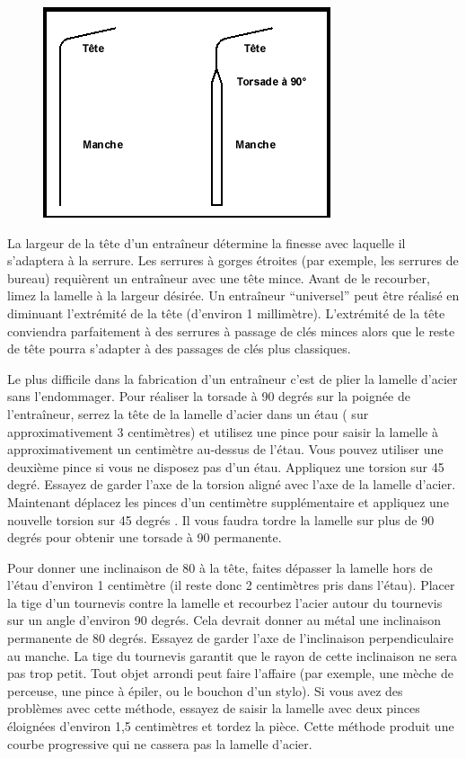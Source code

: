 \documentclass[a4paper,french,11pt,twoside]{report}
\begin{document}
\begin{figure}[h] \begin{center}
    \includegraphics[scale=0.8]{images/Image28}
    \caption{}
\end{center} \end{figure}
La largeur de la tête d'un entraîneur détermine la finesse avec laquelle il s'adaptera à la serrure. Les serrures à gorges étroites (par exemple, les serrures de bureau) requièrent un entraîneur avec une tête mince. Avant de le recourber, limez la lamelle à la largeur désirée. Un entraîneur \enquote{universel} peut être réalisé en diminuant l'extrémité de la tête (d'environ 1 millimètre). L'extrémité de la tête conviendra parfaitement à des serrures à passage de clés minces alors que le reste de tête pourra s'adapter à des passages de clés plus classiques.

Le plus difficile dans la fabrication d'un entraîneur c'est de plier la lamelle d'acier sans l'endommager. Pour réaliser la torsade à 90 degrés sur la poignée de l'entraîneur, serrez la tête de la lamelle d'acier dans un étau ( sur approximativement 3 centimètres) et utilisez une pince pour saisir la lamelle à approximativement un centimètre au-dessus de l'étau. Vous pouvez utiliser une deuxième pince si vous ne disposez pas d'un étau. Appliquez une torsion sur 45 degré. Essayez de garder l'axe de la torsion aligné avec l'axe de la lamelle d'acier. Maintenant déplacez les pinces d'un centimètre supplémentaire et appliquez une nouvelle torsion sur 45 degrés . Il vous faudra tordre la lamelle sur plus de 90 degrés pour obtenir une torsade à 90 permanente.

Pour donner une inclinaison de 80 à la tête, faites dépasser la lamelle hors de l'étau d'environ 1 centimètre (il reste donc 2 centimètres pris dans l'étau). Placer la tige d'un tournevis contre la lamelle et recourbez l'acier autour du tournevis sur un angle d'environ 90 degrés. Cela devrait donner au métal une inclinaison permanente de 80 degrés. Essayez de garder l'axe de l'inclinaison perpendiculaire au manche. La tige du tournevis garantit que le rayon de cette inclinaison ne sera pas trop petit. Tout objet arrondi peut faire l'affaire (par exemple, une mèche de perceuse, une pince à épiler, ou le bouchon d'un stylo). Si vous avez des problèmes avec cette méthode, essayez de saisir la lamelle avec deux pinces éloignées d'environ 1,5 centimètres et tordez la pièce. Cette méthode produit une courbe progressive qui ne cassera pas la lamelle d'acier.
\end{document}
